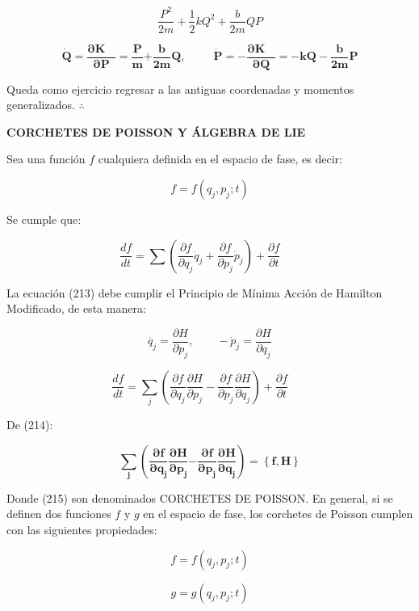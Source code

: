 \documentclass[]{article}
\begin{document}
\[\frac{P^{2}}{2m} + \frac{1}{2}kQ^{2} + \frac{b}{2m}QP\]

\[\dot{\mathbf{Q}}\mathbf{=}\frac{\mathbf{\partial K\ \ \ \ }}{\mathbf{\partial P}}\mathbf{=}\frac{\mathbf{P}}{\mathbf{m}}\mathbf{+}\frac{\mathbf{b}}{\mathbf{2}\mathbf{m}}\mathbf{Q,\ \ \ \ \ \ \ \ \ \ \ }\dot{\mathbf{P}}\mathbf{= -}\frac{\mathbf{\partial K\ \ \ \ }}{\mathbf{\partial Q}}\mathbf{= - kQ -}\frac{\mathbf{b}}{\mathbf{2}\mathbf{m}}\mathbf{P}\]

Queda como ejercicio regresar a las antiguas coordenadas y momentos
generalizados. \(\therefore\)

\textbf{CORCHETES DE POISSON Y ÁLGEBRA DE LIE}

Sea una función \(f\) cualquiera definida en el espacio de fase, es
decir:

\[f = f\left( q_{j},p_{j};t \right)\]

Se cumple que:

\[\frac{df}{dt} = \sum_{}^{}\left( \frac{\partial f}{\partial q_{j}}{\dot{q}}_{j} + \frac{\partial f}{\partial p_{j}}{\dot{p}}_{j} \right) + \frac{\partial f}{\partial t}\ \ \ \ \ \ \ \ \]

La ecuación (213) debe cumplir el Principio de Mínima Acción de Hamilton
Modificado, de esta manera:

\[\dot{q_{j}} = \frac{\partial H}{\partial p_{j}},\ \ \ \ \ \ \ \ \  - {\dot{p}}_{j} = \frac{\partial H}{\partial q_{j}}\]

\[\frac{df}{dt} = \sum_{j}^{}{\left( \frac{\partial f}{\partial q_{j}}\frac{\partial H}{\partial p_{j}} - \frac{\partial f}{\partial p_{j}}\frac{\partial H}{\partial q_{j}} \right) +}\frac{\partial f}{\partial t}\ \ \ \ \ \ \ \ \]

De (214):

\[\sum_{\mathbf{j}}^{}{\left( \frac{\mathbf{\partial f}}{\mathbf{\partial}\mathbf{q}_{\mathbf{j}}}\frac{\mathbf{\partial H}}{\mathbf{\partial}\mathbf{p}_{\mathbf{j}}}\mathbf{-}\frac{\mathbf{\partial f}}{\mathbf{\partial}\mathbf{p}_{\mathbf{j}}}\frac{\mathbf{\partial H}}{\mathbf{\partial}\mathbf{q}_{\mathbf{j}}} \right)\mathbf{=}\left\{ \mathbf{f,H} \right\}}\]

Donde (215) son denominados CORCHETES DE POISSON. En general, si se
definen dos funciones \(f\) y \(g\) en el espacio de fase, los corchetes
de Poisson cumplen con las siguientes propiedades:

\[f = f\left( q_{j},p_{j};t \right)\]

\[g = g\left( q_{j},p_{j};t \right)\]
\end{document}
